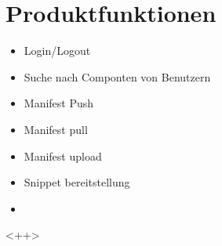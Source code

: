 
\chapter{Produktfunktionen}

\begin{itemize}
	\item Login/Logout
	\item Suche nach Componten von Benutzern
	\item Manifest Push
	\item Manifest pull
	\item Manifest upload
	\item Snippet bereitstellung
	\item 
\end{itemize}<++>
